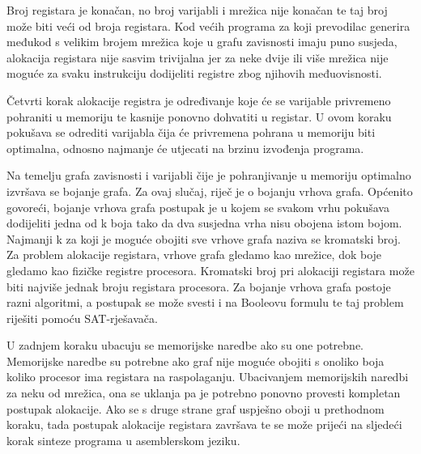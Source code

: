 \documentclass[conference]{IEEEtran}
\begin{document}
Broj registara je konačan, no broj varijabli i mrežica nije konačan te taj broj može biti veći od broja registara. Kod većih programa za koji prevodilac generira međukod s velikim brojem mrežica koje u grafu zavisnosti imaju puno susjeda, alokacija registara nije sasvim trivijalna jer za neke dvije ili više mrežica nije moguće za svaku instrukciju dodijeliti registre zbog njihovih međuovisnosti.

Četvrti korak alokacije registra je određivanje koje će se varijable privremeno pohraniti u memoriju te kasnije ponovno dohvatiti u registar. U ovom koraku pokušava se odrediti varijabla čija će privremena pohrana u memoriju biti optimalna, odnosno najmanje će utjecati na brzinu izvođenja programa.
 
Na temelju grafa zavisnosti i varijabli čije je pohranjivanje u memoriju optimalno izvršava se bojanje grafa. Za ovaj slučaj, riječ je o bojanju vrhova grafa. Općenito govoreći, bojanje vrhova grafa postupak je u kojem se svakom vrhu pokušava dodijeliti jedna od k boja tako da dva susjedna vrha nisu obojena istom bojom. Najmanji k za koji je moguće obojiti sve vrhove grafa naziva se kromatski broj. Za problem alokacije registara, vrhove grafa gledamo kao mrežice, dok boje gledamo kao fizičke registre procesora. Kromatski broj pri alokaciji registara može biti najviše jednak broju registara procesora. Za bojanje vrhova grafa postoje razni algoritmi, a postupak se može svesti i na Booleovu formulu te taj problem riješiti pomoću SAT-rješavača.
 
U zadnjem koraku ubacuju se memorijske naredbe ako su one potrebne. Memorijske naredbe su potrebne ako graf nije moguće obojiti s onoliko boja koliko procesor ima registara na raspolaganju. Ubacivanjem memorijskih naredbi za neku od mrežica, ona se uklanja pa je potrebno ponovno provesti kompletan postupak alokacije. Ako se s druge strane graf uspješno oboji u prethodnom koraku, tada postupak alokacije registara završava te se može prijeći na sljedeći korak sinteze programa u asemblerskom jeziku.
\end{document}
